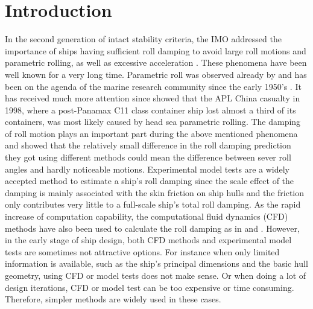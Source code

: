\section{Introduction}
\label{se:introduction}

In the second generation of intact stability criteria, the IMO addressed the importance of ships having sufficient roll damping to avoid large roll motions and parametric rolling, as well as excessive acceleration \parencite{imo_finalization_2016}. These phenomena have been well known for a very long time. Parametric roll was observed already by \parencite{froude_rolling_1861} and has been on
the agenda of the marine research community since the early
1950’s \parencite{galeazzi_early_2013}. It has received much more attention since  \parencite{france_investigation_2001} showed that the APL China casualty in 1998, where a post-Panamax C11 class container ship lost almost a third of its containers, was most likely caused by head sea parametric rolling. The damping of roll motion plays an important part during the above mentioned phenomena and \parencite{soder_ikeda_2019} showed that the relatively small difference in the roll damping prediction they got using different methods could mean the difference between sever roll angles and hardly noticeable motions. 
Experimental model tests are a widely accepted method to estimate a ship's roll damping since the scale effect of the damping is mainly associated with the skin friction on ship hulls and the friction only contributes very little to a full-scale ship's total roll damping\parencite{imo_1200_2006}. As the rapid increase of computation capability, the computational fluid dynamics (CFD) methods have also been used to calculate the roll damping as in \parencite{kristiansen_experimental_2014} and \parencite{henry_peter_piehl_ship_2016}.  
However, in the early stage of ship design, both CFD methods and experimental model tests are sometimes not attractive options. For instance when only limited information is available, such as the ship's principal dimensions and the basic hull geometry, using CFD or model tests does not make sense. Or when doing a lot of design iterations, CFD or model test can be too expensive or time consuming. Therefore, simpler methods are widely used in these cases. 
